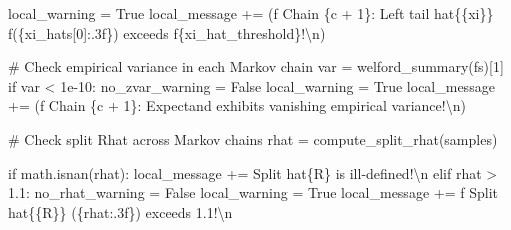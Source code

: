 \documentclass[
  letterpaper,
  DIV=11,
  numbers=noendperiod]{scrartcl}
\newenvironment{Shaded}{\begin{snugshade}}{\end{snugshade}}
\newcommand{\CharTok}[1]{\textcolor[rgb]{0.13,0.47,0.30}{#1}}
\newcommand{\CommentTok}[1]{\textcolor[rgb]{0.37,0.37,0.37}{#1}}
\newcommand{\ControlFlowTok}[1]{\textcolor[rgb]{0.00,0.23,0.31}{#1}}
\newcommand{\DecValTok}[1]{\textcolor[rgb]{0.68,0.00,0.00}{#1}}
\newcommand{\FloatTok}[1]{\textcolor[rgb]{0.68,0.00,0.00}{#1}}
\newcommand{\NormalTok}[1]{\textcolor[rgb]{0.00,0.23,0.31}{#1}}
\newcommand{\OperatorTok}[1]{\textcolor[rgb]{0.37,0.37,0.37}{#1}}
\newcommand{\SpecialCharTok}[1]{\textcolor[rgb]{0.37,0.37,0.37}{#1}}
\newcommand{\SpecialStringTok}[1]{\textcolor[rgb]{0.13,0.47,0.30}{#1}}
\newcommand{\StringTok}[1]{\textcolor[rgb]{0.13,0.47,0.30}{#1}}
\newcommand{\VariableTok}[1]{\textcolor[rgb]{0.07,0.07,0.07}{#1}}
\begin{document}
\begin{Shaded}
\begin{Highlighting}[]
\NormalTok{        local\_warning }\OperatorTok{=} \VariableTok{True}
\NormalTok{        local\_message }\OperatorTok{+=}\NormalTok{ (}\SpecialStringTok{f\textquotesingle{}  Chain }\SpecialCharTok{\{}\NormalTok{c }\OperatorTok{+} \DecValTok{1}\SpecialCharTok{\}}\SpecialStringTok{: Left tail hat}\CharTok{\{\{}\SpecialStringTok{xi}\CharTok{\}\}}\SpecialStringTok{ \textquotesingle{}}
                          \SpecialStringTok{f\textquotesingle{}(}\SpecialCharTok{\{}\NormalTok{xi\_hats[}\DecValTok{0}\NormalTok{]}\SpecialCharTok{:.3f\}}\SpecialStringTok{) exceeds \textquotesingle{}}
                          \SpecialStringTok{f\textquotesingle{}}\SpecialCharTok{\{}\NormalTok{xi\_hat\_threshold}\SpecialCharTok{\}}\SpecialStringTok{!}\CharTok{\textbackslash{}n}\SpecialStringTok{\textquotesingle{}}\NormalTok{)}
      
      \CommentTok{\# Check empirical variance in each Markov chain}
\NormalTok{      var }\OperatorTok{=}\NormalTok{ welford\_summary(fs)[}\DecValTok{1}\NormalTok{]}
      \ControlFlowTok{if}\NormalTok{ var }\OperatorTok{\textless{}} \FloatTok{1e{-}10}\NormalTok{:}
\NormalTok{        no\_zvar\_warning }\OperatorTok{=} \VariableTok{False}
\NormalTok{        local\_warning }\OperatorTok{=} \VariableTok{True}
\NormalTok{        local\_message }\OperatorTok{+=}\NormalTok{ (}\SpecialStringTok{f\textquotesingle{}  Chain }\SpecialCharTok{\{}\NormalTok{c }\OperatorTok{+} \DecValTok{1}\SpecialCharTok{\}}\SpecialStringTok{: Expectand exhibits \textquotesingle{}}
                          \StringTok{\textquotesingle{}vanishing empirical variance!}\CharTok{\textbackslash{}n}\StringTok{\textquotesingle{}}\NormalTok{)}
    
    \CommentTok{\# Check split Rhat across Markov chains}
\NormalTok{    rhat }\OperatorTok{=}\NormalTok{ compute\_split\_rhat(samples)}
    
    \ControlFlowTok{if}\NormalTok{ math.isnan(rhat):}
\NormalTok{      local\_message }\OperatorTok{+=} \StringTok{\textquotesingle{}  Split hat}\SpecialCharTok{\{R\}}\StringTok{ is ill{-}defined!}\CharTok{\textbackslash{}n}\StringTok{\textquotesingle{}}
    \ControlFlowTok{elif}\NormalTok{ rhat }\OperatorTok{\textgreater{}} \FloatTok{1.1}\NormalTok{:}
\NormalTok{      no\_rhat\_warning }\OperatorTok{=} \VariableTok{False}
\NormalTok{      local\_warning }\OperatorTok{=} \VariableTok{True}
\NormalTok{      local\_message }\OperatorTok{+=} \SpecialStringTok{f\textquotesingle{}  Split hat}\CharTok{\{\{}\SpecialStringTok{R}\CharTok{\}\}}\SpecialStringTok{ (}\SpecialCharTok{\{}\NormalTok{rhat}\SpecialCharTok{:.3f\}}\SpecialStringTok{) exceeds 1.1!}\CharTok{\textbackslash{}n}\SpecialStringTok{\textquotesingle{}}
    

\end{Highlighting}
\end{Shaded}
\end{document}
